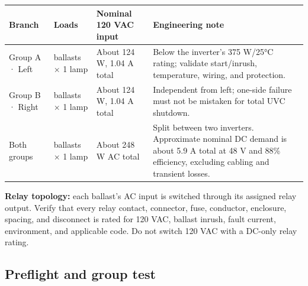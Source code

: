 \documentclass[
  10pt,
  letterpaper,
  openany]{report}
\newcounter{none} %
\begin{document}
{\def\LTcaptype{none} %
\begin{longtable}[]{@{}
  >{\raggedright\arraybackslash}p{}
  >{\raggedright\arraybackslash}p{}
  >{\raggedright\arraybackslash}p{}
  >{\raggedright\arraybackslash}p{}@{}}
\toprule\noalign{}
\begin{minipage}[b]{\linewidth}\raggedright
Branch
\end{minipage} & \begin{minipage}[b]{\linewidth}\raggedright
Loads
\end{minipage} & \begin{minipage}[b]{\linewidth}\raggedright
Nominal 120 VAC input
\end{minipage} & \begin{minipage}[b]{\linewidth}\raggedright
Engineering note
\end{minipage} \\
\midrule\noalign{}
\endhead
\bottomrule\noalign{}
\endlastfoot
Group A · Left & 2 ballasts × 1 lamp & About 124 W, 1.04 A total & Below
the inverter's 375 W/25°C rating; validate start/inrush, temperature,
wiring, and protection. \\
Group B · Right & 2 ballasts × 1 lamp & About 124 W, 1.04 A total &
Independent from left; one-side failure must not be mistaken for total
UVC shutdown. \\
Both groups & 4 ballasts × 1 lamp & About 248 W AC total & Split between
two inverters. Approximate nominal DC demand is about 5.9 A total at 48
V and 88\% efficiency, excluding cabling and transient losses. \\
\end{longtable}
}

\begin{manualwarning}

\textbf{Relay topology:} each ballast's AC input is switched through its
assigned relay output. Verify that every relay contact, connector, fuse,
conductor, enclosure, spacing, and disconnect is rated for 120 VAC,
ballast inrush, fault current, environment, and applicable code. Do not
switch 120 VAC with a DC-only relay rating.

\end{manualwarning}

\subsection{Preflight and group test}\label{preflight-and-group-test}
\end{document}
